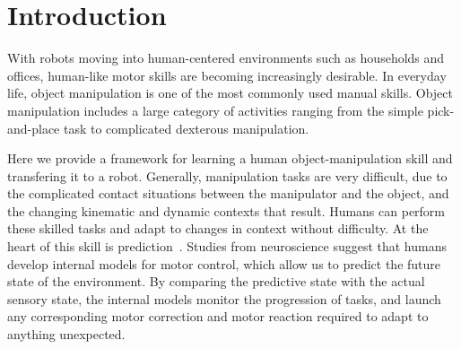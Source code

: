 \section{Introduction}
\label{intro}

With robots moving into human-centered environments such as households
and offices, human-like motor skills are becoming increasingly
desirable. In everyday life, object manipulation is one of the most
commonly used manual skills. Object manipulation includes a large
category of activities ranging from the simple pick-and-place task to
complicated dexterous manipulation.

Here we provide a framework for learning a human object-manipulation skill
and transfering it to a robot.
Generally, manipulation tasks are very difficult, due to the
complicated contact situations between the manipulator and the object,
and the changing kinematic and dynamic contexts that result. Humans
can perform these skilled tasks and adapt to changes in context
without difficulty. At the heart of this skill is
prediction~\citep{flanagan2006control}. Studies from neuroscience
suggest that humans develop internal models for motor control, which
allow us to predict the future state of the environment. By comparing
the predictive state with the actual sensory state, the internal
models monitor the progression of  tasks, and launch any
corresponding motor correction and motor reaction required to
adapt to anything unexpected. %

